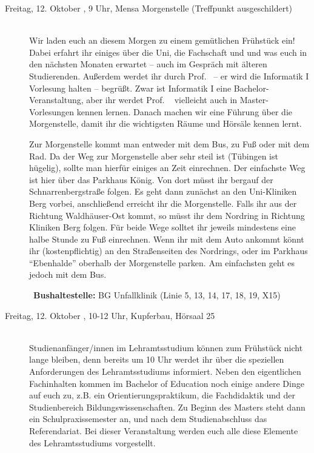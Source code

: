 \begin{description}
\item[Freitag, 12. Oktober \Jahr, 9 Uhr, Mensa Morgenstelle (Treffpunkt ausgeschildert)]\ \\
Wir laden euch an diesem Morgen zu einem gemütlichen Frühstück ein! Dabei erfahrt ihr einiges über die Uni, die Fachschaft und und was euch in den nächsten Monaten erwartet -- auch im Gespräch mit älteren
Studierenden. Außerdem werdet ihr durch Prof. \Infoprof~-- er wird die Informatik I Vorlesung halten -- begrüßt.
\ifmaster Zwar ist Informatik I eine Bachelor-Veranstaltung, aber ihr werdet Prof. \Infoprof~ vielleicht auch in Master-Vorlesungen kennen lernen. \fi 
Danach machen wir eine Führung über die Morgenstelle, damit ihr die wichtigsten Räume und Hörsäle kennen lernt. 

Zur Morgenstelle kommt man entweder mit dem Bus, zu Fuß oder mit dem Rad. Da der Weg zur Morgenstelle aber sehr steil ist (Tübingen ist hügelig), sollte man hierfür einiges an Zeit einrechnen.
Der einfachste Weg ist hier über das Parkhaus König. Von dort müsst ihr bergauf der Schnarrenbergstraße folgen. Es geht dann zunächst an den Uni-Kliniken Berg vorbei, anschließend erreicht ihr die Morgenstelle. Falls ihr aus der Richtung Waldh\"auser-Ost kommt, so m\"usst ihr dem Nordring in Richtung Kliniken Berg folgen. Für beide Wege solltet ihr jeweils mindestens eine halbe Stunde zu Fuß einrechnen.
Wenn ihr mit dem Auto ankommt k\"onnt ihr (kostenpflichtig) an den Straßenseiten des Nordrings, oder im Parkhaus "`Ebenhalde"' oberhalb der Morgenstelle parken. Am einfachsten geht es jedoch mit dem Bus.

~\textbf{Bushaltestelle:} BG Unfallklinik (Linie 5, 13, 14, 17, 18, 19, X15)

\iflehramt
\item[Freitag, 12. Oktober \Jahr, 10-12 Uhr, Kupferbau, Hörsaal 25]\ \\
Studienanfänger/innen im Lehramtsstudium können zum Frühstück nicht lange bleiben, denn bereits um 10 Uhr werdet ihr über die speziellen 
Anforderungen des Lehramtsstudiums informiert. Neben den eigentlichen Fachinhalten kommen im 
Bachelor of Education noch einige andere Dinge auf euch zu, z.B. ein Orientierungspraktikum, die 
Fachdidaktik und der Studienbereich Bildungswissenschaften. Zu Beginn des Masters steht dann 
ein Schulpraxissemester an, und nach dem Studienabschluss das Referendariat. Bei dieser Veranstaltung werden euch 
alle diese Elemente des Lehramtsstudiums vorgestellt.


\end{description}
